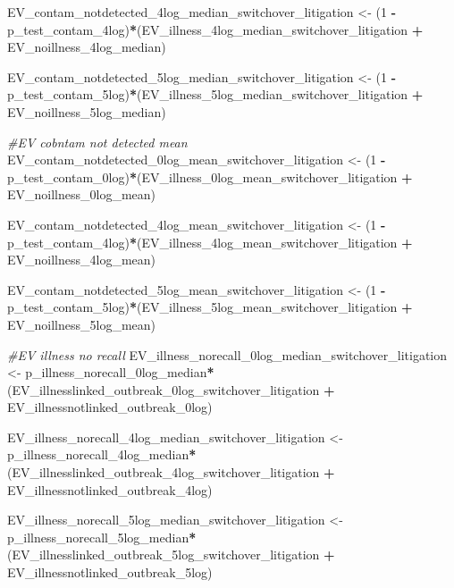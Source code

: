 \documentclass[
]{article}
\newenvironment{Shaded}{\begin{snugshade}}{\end{snugshade}}
\newcommand{\CommentTok}[1]{\textcolor[rgb]{0.56,0.35,0.01}{\textit{#1}}}
\newcommand{\DecValTok}[1]{\textcolor[rgb]{0.00,0.00,0.81}{#1}}
\newcommand{\NormalTok}[1]{#1}
\newcommand{\OtherTok}[1]{\textcolor[rgb]{0.56,0.35,0.01}{#1}}
\newcommand{\SpecialCharTok}[1]{\textcolor[rgb]{0.81,0.36,0.00}{\textbf{#1}}}
\begin{document}
\begin{Shaded}
\begin{Highlighting}[]
\NormalTok{EV\_contam\_notdetected\_4log\_median\_switchover\_litigation }\OtherTok{\textless{}{-}}\NormalTok{ (}\DecValTok{1} \SpecialCharTok{{-}}\NormalTok{ p\_test\_contam\_4log)}\SpecialCharTok{*}\NormalTok{(EV\_illness\_4log\_median\_switchover\_litigation }\SpecialCharTok{+}\NormalTok{ EV\_noillness\_4log\_median)}

\NormalTok{EV\_contam\_notdetected\_5log\_median\_switchover\_litigation }\OtherTok{\textless{}{-}}\NormalTok{ (}\DecValTok{1} \SpecialCharTok{{-}}\NormalTok{ p\_test\_contam\_5log)}\SpecialCharTok{*}\NormalTok{(EV\_illness\_5log\_median\_switchover\_litigation }\SpecialCharTok{+}\NormalTok{ EV\_noillness\_5log\_median)}

\CommentTok{\#EV cobntam not detected mean}
\NormalTok{EV\_contam\_notdetected\_0log\_mean\_switchover\_litigation }\OtherTok{\textless{}{-}}\NormalTok{ (}\DecValTok{1} \SpecialCharTok{{-}}\NormalTok{ p\_test\_contam\_0log)}\SpecialCharTok{*}\NormalTok{(EV\_illness\_0log\_mean\_switchover\_litigation }\SpecialCharTok{+}\NormalTok{ EV\_noillness\_0log\_mean)}

\NormalTok{EV\_contam\_notdetected\_4log\_mean\_switchover\_litigation }\OtherTok{\textless{}{-}}\NormalTok{ (}\DecValTok{1} \SpecialCharTok{{-}}\NormalTok{ p\_test\_contam\_4log)}\SpecialCharTok{*}\NormalTok{(EV\_illness\_4log\_mean\_switchover\_litigation }\SpecialCharTok{+}\NormalTok{ EV\_noillness\_4log\_mean)}

\NormalTok{EV\_contam\_notdetected\_5log\_mean\_switchover\_litigation }\OtherTok{\textless{}{-}}\NormalTok{ (}\DecValTok{1} \SpecialCharTok{{-}}\NormalTok{ p\_test\_contam\_5log)}\SpecialCharTok{*}\NormalTok{(EV\_illness\_5log\_mean\_switchover\_litigation }\SpecialCharTok{+}\NormalTok{ EV\_noillness\_5log\_mean)}

\CommentTok{\#EV illness no recall}
\NormalTok{EV\_illness\_norecall\_0log\_median\_switchover\_litigation }\OtherTok{\textless{}{-}}\NormalTok{ p\_illness\_norecall\_0log\_median}\SpecialCharTok{*}\NormalTok{(EV\_illnesslinked\_outbreak\_0log\_switchover\_litigation }\SpecialCharTok{+}\NormalTok{ EV\_illnessnotlinked\_outbreak\_0log)}

\NormalTok{EV\_illness\_norecall\_4log\_median\_switchover\_litigation }\OtherTok{\textless{}{-}}\NormalTok{ p\_illness\_norecall\_4log\_median}\SpecialCharTok{*}\NormalTok{(EV\_illnesslinked\_outbreak\_4log\_switchover\_litigation }\SpecialCharTok{+}\NormalTok{ EV\_illnessnotlinked\_outbreak\_4log)}

\NormalTok{EV\_illness\_norecall\_5log\_median\_switchover\_litigation }\OtherTok{\textless{}{-}}\NormalTok{ p\_illness\_norecall\_5log\_median}\SpecialCharTok{*}\NormalTok{(EV\_illnesslinked\_outbreak\_5log\_switchover\_litigation }\SpecialCharTok{+}\NormalTok{ EV\_illnessnotlinked\_outbreak\_5log)}


\end{Highlighting}
\end{Shaded}
\end{document}
